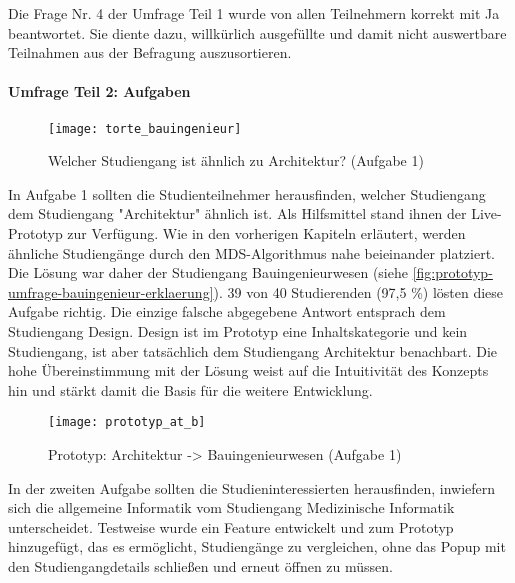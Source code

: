 Die Frage Nr. 4 der Umfrage Teil 1 wurde von allen Teilnehmern korrekt mit \glqq Ja\grqq{} beantwortet. Sie diente dazu, willkürlich ausgefüllte und damit nicht auswertbare Teilnahmen aus der Befragung auszusortieren.

\paragraph{Umfrage Teil 2: Aufgaben}

\begin{figure}[H]
    \centering
    \texttt{[image: torte\_bauingenieur]}
    \caption{Welcher Studiengang ist ähnlich zu Architektur? (Aufgabe 1)}
    \label{fig:prototyp-umfrage-bauingenieur}
\end{figure}

In Aufgabe 1 sollten die Studienteilnehmer herausfinden, welcher Studiengang dem Studiengang "Architektur" ähnlich ist. Als Hilfsmittel stand ihnen der Live-Prototyp zur Verfügung. Wie in den vorherigen Kapiteln erläutert, werden ähnliche Studiengänge durch den MDS-Algorithmus nahe beieinander platziert. Die Lösung war daher der Studiengang \glqq Bauingenieurwesen\grqq{} (siehe \autoref{fig:prototyp-umfrage-bauingenieur-erklaerung}). 39 von 40 Studierenden (97,5 \%) lösten diese Aufgabe richtig. Die einzige falsche abgegebene Antwort entsprach dem Studiengang \glqq Design\grqq{}. \glqq Design\grqq{} ist im Prototyp eine Inhaltskategorie und kein Studiengang, ist aber tatsächlich dem Studiengang \glqq Architektur\grqq{} benachbart. Die hohe Übereinstimmung mit der Lösung weist auf die Intuitivität des Konzepts hin und stärkt damit die Basis für die weitere Entwicklung.

\begin{figure}[H]
    \centering
    \texttt{[image: prototyp\_at\_b]}
    \caption{Prototyp: Architektur -> Bauingenieurwesen (Aufgabe 1)}
    \label{fig:prototyp-umfrage-bauingenieur-erklaerung}
\end{figure}

In der zweiten Aufgabe sollten die Studieninteressierten herausfinden, inwiefern sich die allgemeine Informatik vom Studiengang Medizinische Informatik unterscheidet. Testweise wurde ein Feature entwickelt und zum Prototyp hinzugefügt, das es ermöglicht, Studiengänge zu vergleichen, ohne das Popup mit den Studiengangdetails schließen und erneut öffnen zu müssen.

